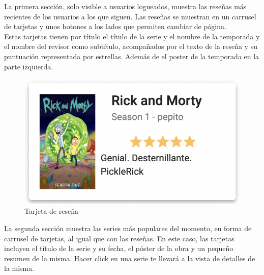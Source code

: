 La primera sección, solo visible a usuarios logueados, muestra las reseñas más recientes de los usuarios a los que
siguen. Las reseñas se muestran en un carrusel de tarjetas y unos botones a los lados que permiten cambiar de página.\\

Estas tarjetas tienen por título el título de la serie y el nombre de la temporada y el nombre del revisor como
subtítulo, acompañados por el texto de la reseña y su puntuación representada por estrellas. Además de el poster de la
temporada en la parte izquierda.\\

\begin{figure}[H]
    \centering	
        \includegraphics[scale=0.5]{img/review-card.png}
    \caption{ Tarjeta de reseña }\label{fig:review-card}
\end{figure}

La segunda sección muestra las series más populares del momento, en forma de carrusel de tarjetas, al igual que con las
reseñas. En este caso, las tarjetas incluyen el título de la serie y su fecha, el póster de la obra y un pequeño resumen
de la misma. Hacer click en una serie te llevará a la vista de detalles de la misma.\\

